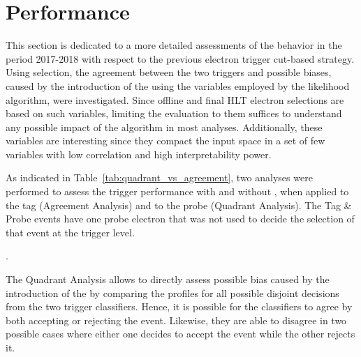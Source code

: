 
\chapter{\rnn{} Performance}%
\label{sec:off_ana}

This section is dedicated to a more detailed assessments of the \rnn{} behavior 
in the period 2017-2018 with respect to the previous electron trigger cut-based strategy.
Using \Zee{} \tnp{} selection, the agreement between the two triggers and
possible biases, caused by the introduction of the \rnn{} using the variables
employed by the likelihood algorithm, were investigated.
Since offline and final HLT electron
selections are based on such variables, limiting the evaluation to them suffices
to understand any possible impact of the \rnn{} algorithm in most analyses.
Additionally, these variables are interesting since they compact the input space
in a set of few variables with low correlation and high interpretability power. 

As indicated in Table~\ref{tab:quadrant_vs_agreement}, two analyses were performed to assess the
trigger performance with and without \rnn{}, when applied to the tag (Agreement Analysis) and
to the probe (Quadrant Analysis). The Tag \& Probe events have one probe electron that was not 
used to decide the selection of that event at the trigger level.


\begin{table}[ht!]\footnotesize
\centering
\caption{Customized \Zee{} \tap{} selection criteria employed in the
agreement and quadrant analyses in the Run 2 (2017-2018 period)}.%
\label{tab:quadrant_vs_agreement}
\end{table}

The Quadrant Analysis allows to directly assess possible bias caused by the
introduction of the \rnn{} by comparing the profiles for all possible disjoint
decisions from the two trigger classifiers. Hence, it is possible for the classifiers
to agree by both accepting or rejecting the event. Likewise, they are able to
disagree in two possible cases where either one decides to accept the event
while the other rejects it.

